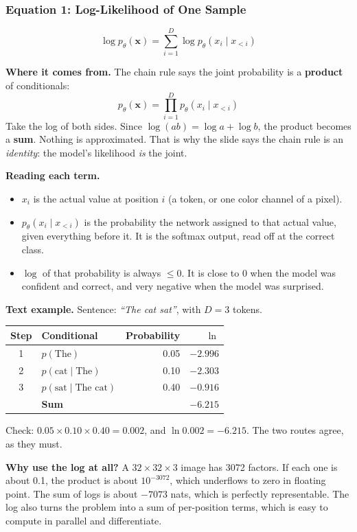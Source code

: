 \subsubsection*{Equation 1: Log-Likelihood of One Sample}

$$\log p_\theta(\mathbf{x}) = \sum_{i=1}^{D} \log p_\theta(x_i \mid x_{<i})$$

\textbf{Where it comes from.} The chain rule says the joint probability is a \textbf{product} of conditionals:
$$p_\theta(\mathbf{x}) = \prod_{i=1}^{D} p_\theta(x_i \mid x_{<i})$$
Take the log of both sides. Since $\log(ab) = \log a + \log b$, the product becomes a \textbf{sum}. Nothing is approximated. That is why the slide says the chain rule is an \textit{identity}: the model's likelihood \textit{is} the joint.

\textbf{Reading each term.}
\begin{itemize}
  \item $x_i$ is the actual value at position $i$ (a token, or one color channel of a pixel).
  \item $p_\theta(x_i \mid x_{<i})$ is the probability the network assigned to that actual value, given everything before it. It is the softmax output, read off at the correct class.
  \item $\log$ of that probability is always $\le 0$. It is close to 0 when the model was confident and correct, and very negative when the model was surprised.
\end{itemize}

\textbf{Text example.} Sentence: \textit{``The cat sat''}, with $D = 3$ tokens.

\begin{center}
\begin{tabular}{clrr}
\toprule
Step & Conditional & Probability & $\ln$ \\
\midrule
1 & $p(\text{The})$ & 0.05 & $-2.996$ \\
2 & $p(\text{cat} \mid \text{The})$ & 0.10 & $-2.303$ \\
3 & $p(\text{sat} \mid \text{The cat})$ & 0.40 & $-0.916$ \\
\midrule
 & \textbf{Sum} & & $\mathbf{-6.215}$ \\
\bottomrule
\end{tabular}
\end{center}

Check: $0.05 \times 0.10 \times 0.40 = 0.002$, and $\ln 0.002 = -6.215$. The two routes agree, as they must.

\textbf{Why use the log at all?} A $32 \times 32 \times 3$ image has 3072 factors. If each one is about 0.1, the product is about $10^{-3072}$, which underflows to zero in floating point. The sum of logs is about $-7073$ nats, which is perfectly representable. The log also turns the problem into a sum of per-position terms, which is easy to compute in parallel and differentiate.

